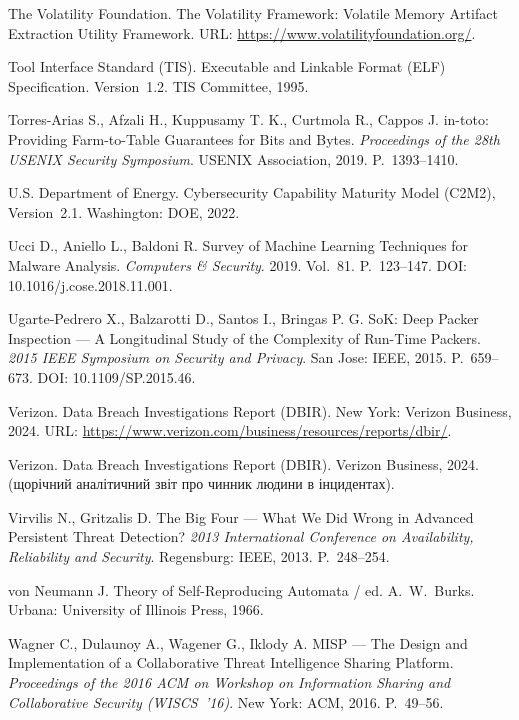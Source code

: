  The Volatility Foundation. The Volatility Framework: Volatile Memory Artifact Extraction Utility Framework. URL: \url{https://www.volatilityfoundation.org/}.

 Tool Interface Standard (TIS). Executable and Linkable Format (ELF) Specification. Version~1.2. TIS Committee, 1995.

 Torres-Arias S., Afzali H., Kuppusamy T. K., Curtmola R., Cappos J. in-toto: Providing Farm-to-Table Guarantees for Bits and Bytes. \emph{Proceedings of the 28th USENIX Security Symposium}. USENIX Association, 2019. P.~1393--1410.

 U.S. Department of Energy. Cybersecurity Capability Maturity Model (C2M2), Version~2.1. Washington: DOE, 2022.

 Ucci D., Aniello L., Baldoni R. Survey of Machine Learning Techniques for Malware Analysis. \emph{Computers \& Security}. 2019. Vol.~81. P.~123--147. DOI: 10.1016/j.cose.2018.11.001.

 Ugarte-Pedrero X., Balzarotti D., Santos I., Bringas P. G. SoK: Deep Packer Inspection --- A Longitudinal Study of the Complexity of Run-Time Packers. \emph{2015 IEEE Symposium on Security and Privacy}. San Jose: IEEE, 2015. P.~659--673. DOI: 10.1109/SP.2015.46.

 Verizon. Data Breach Investigations Report (DBIR). New York: Verizon Business, 2024. URL: \url{https://www.verizon.com/business/resources/reports/dbir/}.

 Verizon. Data Breach Investigations Report (DBIR). Verizon Business, 2024. (щорічний аналітичний звіт про чинник людини в інцидентах).

 Virvilis N., Gritzalis D. The Big Four --- What We Did Wrong in Advanced Persistent Threat Detection? \emph{2013 International Conference on Availability, Reliability and Security}. Regensburg: IEEE, 2013. P.~248--254.

 von Neumann J. Theory of Self-Reproducing Automata / ed. A.~W.~Burks. Urbana: University of Illinois Press, 1966.

 Wagner C., Dulaunoy A., Wagener G., Iklody A. MISP --- The Design and Implementation of a Collaborative Threat Intelligence Sharing Platform. \emph{Proceedings of the 2016 ACM on Workshop on Information Sharing and Collaborative Security (WISCS~'16)}. New York: ACM, 2016. P.~49--56.

